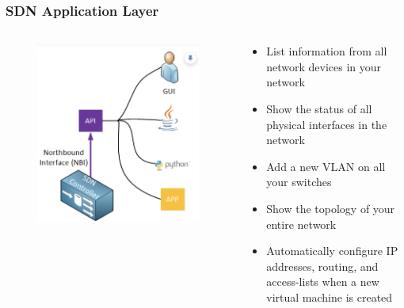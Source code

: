 \documentclass{beamer}
\begin{document}
\begin{frame}
  \frametitle{SDN Application Layer}
  \begin{columns}
    \begin{column}{0.55\textwidth}
      \begin{figure}
        \centering
        \includegraphics[scale=0.4]{images/sdn-16}
      \end{figure}
    \end{column}
    \begin{column}{0.5\textwidth}
      \begin{itemize}[<+->]
      \item[\ding{219}] List information from all network devices in your network
      \item[\ding{219}] Show the status of all physical interfaces in the network
      \item [\ding{219}] Add a new VLAN on all your switches
      \item [\ding{219}] Show the topology of your entire network
      \item [\ding{219}] Automatically configure IP addresses, routing, and access-lists when a new virtual machine is created
    \end{itemize}
    \end{column}
  \end{columns}
\end{frame}
\end{document}
